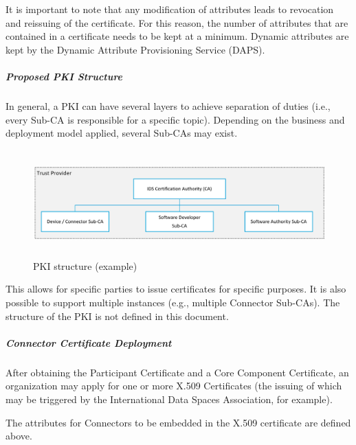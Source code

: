 It is important to note that any modification of attributes leads to revocation and reissuing of the certificate. For this reason, the number of attributes that are contained in a certificate needs to be kept at a minimum. Dynamic attributes are kept by the Dynamic Attribute Provisioning Service (DAPS).

\subparagraph*{Proposed PKI Structure\\}
In general, a PKI can have several layers to achieve separation of duties (i.e., every Sub-CA is responsible for a specific topic). Depending on the business and deployment model applied, several Sub-CAs may exist.




\begin{figure}[H]
	\begin{Center}
		\includegraphics[width=6.53in,height=1.62in]{./media/image58.png}
		\caption{ PKI structure (example)}
		\label{fig:_PKI_structure_example}
	\end{Center}
\end{figure}




This allows for specific parties to issue certificates for specific purposes. It is also possible to support multiple instances (e.g., multiple Connector Sub-CAs). The structure of the PKI is not defined in this document.

\subparagraph*{Connector Certificate Deployment\\}
After obtaining the Participant Certificate and a Core Component Certificate, an organization may apply for one or more X.509 Certificates (the issuing of which may be triggered by the International Data Spaces Association, for example).

The attributes for Connectors to be embedded in the X.509 certificate are defined above.

